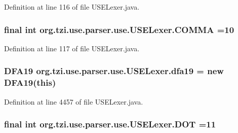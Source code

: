 Definition at line 116 of file U\-S\-E\-Lexer.\-java.

\hypertarget{classorg_1_1tzi_1_1use_1_1parser_1_1use_1_1_u_s_e_lexer_a48a4351c67d74b9cf64f9dac03e43388}{
\subsubsection[{C\-O\-M\-M\-A}]{\setlength{\rightskip}{0pt plus 5cm}final int org.\-tzi.\-use.\-parser.\-use.\-U\-S\-E\-Lexer.\-C\-O\-M\-M\-A =10\hspace{0.3cm}{\ttfamily [static]}}}\label{classorg_1_1tzi_1_1use_1_1parser_1_1use_1_1_u_s_e_lexer_a48a4351c67d74b9cf64f9dac03e43388}


Definition at line 117 of file U\-S\-E\-Lexer.\-java.

\hypertarget{classorg_1_1tzi_1_1use_1_1parser_1_1use_1_1_u_s_e_lexer_a92f8e7c9903220eecd7d7c41a0059e1d}{
\subsubsection[{dfa19}]{\setlength{\rightskip}{0pt plus 5cm}D\-F\-A19 org.\-tzi.\-use.\-parser.\-use.\-U\-S\-E\-Lexer.\-dfa19 = new D\-F\-A19(this)\hspace{0.3cm}{\ttfamily [protected]}}}\label{classorg_1_1tzi_1_1use_1_1parser_1_1use_1_1_u_s_e_lexer_a92f8e7c9903220eecd7d7c41a0059e1d}


Definition at line 4457 of file U\-S\-E\-Lexer.\-java.

\hypertarget{classorg_1_1tzi_1_1use_1_1parser_1_1use_1_1_u_s_e_lexer_a842b02d5fc69f21cfa6d81e5a9fdfe1a}{
\subsubsection[{D\-O\-T}]{\setlength{\rightskip}{0pt plus 5cm}final int org.\-tzi.\-use.\-parser.\-use.\-U\-S\-E\-Lexer.\-D\-O\-T =11\hspace{0.3cm}{\ttfamily [static]}}}\label{classorg_1_1tzi_1_1use_1_1parser_1_1use_1_1_u_s_e_lexer_a842b02d5fc69f21cfa6d81e5a9fdfe1a}


